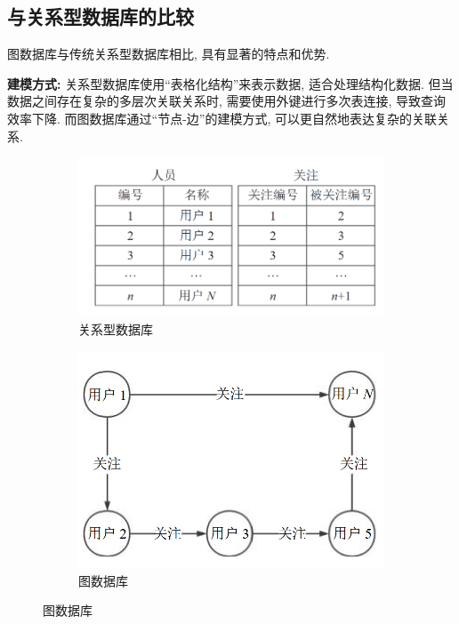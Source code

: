 \documentclass[12pt,hyperref,a4paper,UTF8]{ctexart}
\begin{document}
\subsection{与关系型数据库的比较}

图数据库与传统关系型数据库相比, 具有显著的特点和优势.

\textbf{建模方式:} 关系型数据库使用“表格化结构”来表示数据, 适合处理结构化数据. 但当数据之间存在复杂的多层次关联关系时, 需要使用外键进行多次表连接, 导致查询效率下降. 而图数据库通过“节点-边”的建模方式, 可以更自然地表达复杂的关联关系.
\begin{figure}[H]
	\centering
	\begin{subfigure}[b]{0.45\textwidth}
		\centering
		\includegraphics[width=\textwidth]{images/1.png}
		\caption{关系型数据库}
	\end{subfigure}
	\hfill
	\begin{subfigure}[b]{0.45\textwidth}
		\centering
		\includegraphics[width=\textwidth]{images/2.png}
		\caption{图数据库}
	\end{subfigure}
\end{figure}
\end{document}
